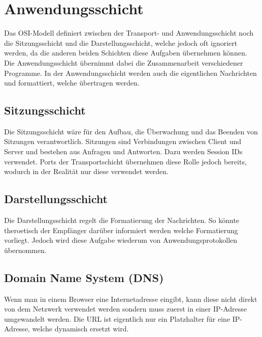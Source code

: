\documentclass{article}
\begin{document}
	 \section{Anwendungsschicht}
	 Das OSI-Modell definiert zwischen der Transport- und Anwendungsschicht noch die Sitzungsschicht und die Darstellungsschicht, welche jedoch oft ignoriert werden, da die anderen beiden Schichten diese Aufgaben übernehmen können.\\
	 Die Anwendungsschicht übernimmt dabei die Zusammenarbeit verschiedener Programme. In der Anwendungsschicht werden auch die eigentlichen Nachrichten und formattiert, welche übertragen werden.
	 \subsection{Sitzungsschicht}
	 Die Sitzungsschicht wäre für den Aufbau, die Überwachung und das Beenden von Sitzungen verantwortlich. Sitzungen sind Verbindungen zwischen Client und Server und bestehen aus Anfragen und Antworten. Dazu werden Session IDs verwendet. Ports der Transportschicht übernehmen diese Rolle jedoch bereits, wodurch in der Realität nur diese verwendet werden.
	 \subsection{Darstellungsschicht}
	 Die Darstellungsschicht regelt die Formatierung der Nachrichten. So könnte theroetisch der Empfänger darüber informiert werden welche Formatierung vorliegt. Jedoch wird diese Aufgabe wiederum von Anwendungsprotokollen übernommen.
	 \subsection{Domain Name System (DNS)}
	 Wenn man in einem Browser eine Internetadresse eingibt, kann diese nicht direkt von dem Netzwerk verwendet werden sondern muss zuerst in einer IP-Adresse umgewandelt werden. Die URL ist eigentlich nur ein Platzhalter für eine IP-Adresse, welche dynamisch ersetzt wird. \\
\end{document}
